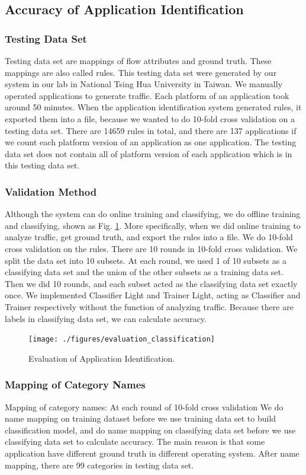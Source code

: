 \documentclass[journal]{IEEEtran}
\begin{document}
\subsection{Accuracy of Application Identification}
\subsubsection{Testing Data Set}
Testing data set are mappings of flow attributes and ground truth.
These mappings are also called rules.
This testing data set were generated by our system in our lab in National Tsing Hua University in Taiwan.
We manually operated applications to generate traffic.
Each platform of an application took around 50 minutes.
When the application identification system generated rules, it exported them into a file,
because we wanted to do 10-fold cross validation on a testing data set.
There are 14659 rules in total,
and there are 137 applications if we count each platform version of an application as one application.
The testing data set does not contain all of platform version of each application which is in this testing data set.

\subsubsection{Validation Method}
Although the system can do online training and classifying,
we do offline training and classifying, shown as Fig. \ref{fig:evaluation_classification}.
More specifically, when we did online training to analyze traffic,
get ground truth, and export the rules into a file. We do 10-fold cross validation on the rules.
There are 10 rounds in 10-fold cross validation. We split the data set into 10 subsets.
At each round, we used 1 of 10 subsets as a classifying data set and the union of the other subsets as a training data set.
Then we did 10 rounds, and each subset acted as the classifying data set exactly once.
We implemented Classifier Light and Trainer Light, acting as Classifier and Trainer respectively without the function of analyzing traffic.
Because there are labels in classifying data set, we can calculate accuracy.

\begin{figure}[!t]
\centering
\texttt{[image: ./figures/evaluation\_classification]}
\caption{Evaluation of Application Identification.}
\label{fig:evaluation_classification}
\end{figure}

\subsubsection{Mapping of Category Names}
Mapping of category names: At each round of 10-fold cross validation We do name mapping on training dataset
before we use training data set to build classification model,
and do name mapping on classifying data set before we use classifying data set to calculate accuracy.
The main reason is that some application have different ground truth in different operating system.
After name mapping, there are 99 categories in testing data set.
\end{document}
